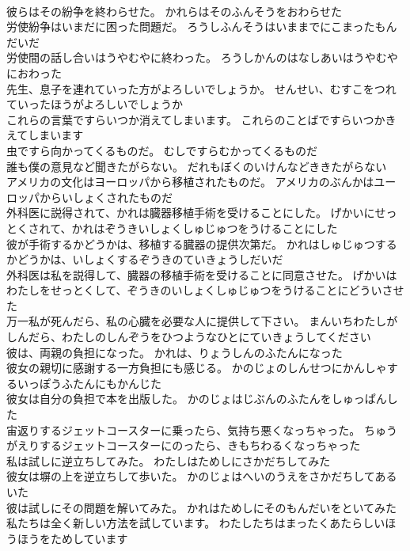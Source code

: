 \documentclass[8pt]{extreport}
\begin{document}
\begin{CJK}{UTF8}{min}
\\	彼らはその紛争を終わらせた。	かれらはそのふんそうをおわらせた 
\\	労使紛争はいまだに困った問題だ。	ろうしふんそうはいままでにこまったもんだいだ 
\\	労使間の話し合いはうやむやに終わった。	ろうしかんのはなしあいはうやむやにおわった 
\\	先生、息子を連れていった方がよろしいでしょうか。	せんせい、むすこをつれていったほうがよろしいでしょうか 
\\	これらの言葉ですらいつか消えてしまいます。	これらのことばですらいつかきえてしまいます 
\\	虫ですら向かってくるものだ。	むしですらむかってくるものだ 
\\	誰も僕の意見など聞きたがらない。	だれもぼくのいけんなどききたがらない 
\\	アメリカの文化はヨーロッパから移植されたものだ。	アメリカのぶんかはユーロッパからいしょくされたものだ 
\\	外科医に説得されて、かれは臓器移植手術を受けることにした。	げかいにせっとくされて、かれはぞうきいしょくしゅじゅつをうけることにした 
\\	彼が手術するかどうかは、移植する臓器の提供次第だ。	かれはしゅじゅつするかどうかは、いしょくするぞうきのていきょうしだいだ 
\\	外科医は私を説得して、臓器の移植手術を受けることに同意させた。	げかいはわたしをせっとくして、ぞうきのいしょくしゅじゅつをうけることにどういさせた 
\\	万一私が死んだら、私の心臓を必要な人に提供して下さい。	まんいちわたしがしんだら、わたしのしんぞうをひつようなひとにていきょうしてください 
\\	彼は、両親の負担になった。	かれは、りょうしんのふたんになった 
\\	彼女の親切に感謝する一方負担にも感じる。	かのじょのしんせつにかんしゃするいっぽうふたんにもかんじた 
\\	彼女は自分の負担で本を出版した。	かのじょはじぶんのふたんをしゅっぱんした 
\\	宙返りするジェットコースターに乗ったら、気持ち悪くなっちゃった。	ちゅうがえりするジェットコースターにのったら、きもちわるくなっちゃった 
\\	私は試しに逆立ちしてみた。	わたしはためしにさかだちしてみた 
\\	彼女は塀の上を逆立ちして歩いた。	かのじょはへいのうえをさかだちしてあるいた 
\\	彼は試しにその問題を解いてみた。	かれはためしにそのもんだいをといてみた 
\\	私たちは全く新しい方法を試しています。	わたしたちはまったくあたらしいほうほうをためしています 

\end{CJK}
\end{document}
